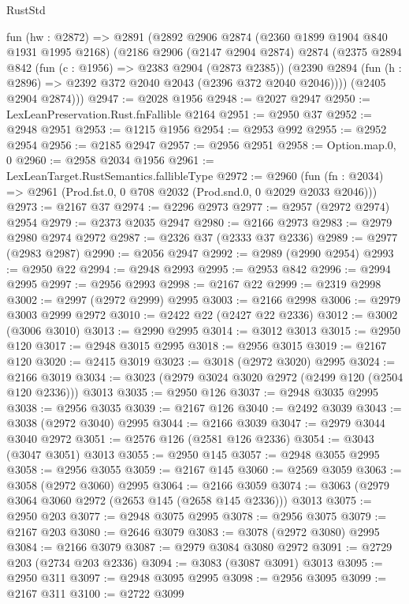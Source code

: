 \begin{lexlean}{RustStd}
\begin{coremodule}
  fun (hw : @2872) =>
  @2891
    (@2892
      @2906
      @2874
      (@2360 @1899 @1904 @840 @1931 @1995 @2168)
      (@2186
        @2906
        (@2147 @2904 @2874)
        @2874
        (@2375
          @2894
          @842
          (fun (c : @1956) => @2383 @2904 (@2873 @2385))
          (@2390 @2894 (fun (h : @2896) => @2392 @372 @2040 @2043 (@2396 @372 @2040 @2046))))
        (@2405 @2904 @2874)))
@2947 := @2028 @1956
@2948 := @2027 @2947
@2950 := LexLeanPreservation.Rust.fnFallible @2164
@2951 := @2950 @37
@2952 := @2948 @2951
@2953 := @1215 @1956
@2954 := @2953 @992
@2955 := @2952 @2954
@2956 := @2185 @2947
@2957 := @2956 @2951
@2958 := Option.map.{0, 0}
@2960 := @2958 @2034 @1956
@2961 := LexLeanTarget.RustSemantics.fallibleType
@2972 := @2960
    (fun (fn : @2034) => @2961 (Prod.fst.{0, 0} @708 @2032 (Prod.snd.{0, 0} @2029 @2033 @2046)))
@2973 := @2167 @37
@2974 := @2296 @2973
@2977 := @2957 (@2972 @2974) @2954
@2979 := @2373 @2035 @2947
@2980 := @2166 @2973
@2983 := @2979 @2980 @2974 @2972
@2987 := @2326 @37 (@2333 @37 @2336)
@2989 := @2977 (@2983 @2987)
@2990 := @2056 @2947
@2992 := @2989 (@2990 @2954)
@2993 := @2950 @22
@2994 := @2948 @2993
@2995 := @2953 @842
@2996 := @2994 @2995
@2997 := @2956 @2993
@2998 := @2167 @22
@2999 := @2319 @2998
@3002 := @2997 (@2972 @2999) @2995
@3003 := @2166 @2998
@3006 := @2979 @3003 @2999 @2972
@3010 := @2422 @22 (@2427 @22 @2336)
@3012 := @3002 (@3006 @3010)
@3013 := @2990 @2995
@3014 := @3012 @3013
@3015 := @2950 @120
@3017 := @2948 @3015 @2995
@3018 := @2956 @3015
@3019 := @2167 @120
@3020 := @2415 @3019
@3023 := @3018 (@2972 @3020) @2995
@3024 := @2166 @3019
@3034 := @3023 (@2979 @3024 @3020 @2972 (@2499 @120 (@2504 @120 @2336))) @3013
@3035 := @2950 @126
@3037 := @2948 @3035 @2995
@3038 := @2956 @3035
@3039 := @2167 @126
@3040 := @2492 @3039
@3043 := @3038 (@2972 @3040) @2995
@3044 := @2166 @3039
@3047 := @2979 @3044 @3040 @2972
@3051 := @2576 @126 (@2581 @126 @2336)
@3054 := @3043 (@3047 @3051) @3013
@3055 := @2950 @145
@3057 := @2948 @3055 @2995
@3058 := @2956 @3055
@3059 := @2167 @145
@3060 := @2569 @3059
@3063 := @3058 (@2972 @3060) @2995
@3064 := @2166 @3059
@3074 := @3063 (@2979 @3064 @3060 @2972 (@2653 @145 (@2658 @145 @2336))) @3013
@3075 := @2950 @203
@3077 := @2948 @3075 @2995
@3078 := @2956 @3075
@3079 := @2167 @203
@3080 := @2646 @3079
@3083 := @3078 (@2972 @3080) @2995
@3084 := @2166 @3079
@3087 := @2979 @3084 @3080 @2972
@3091 := @2729 @203 (@2734 @203 @2336)
@3094 := @3083 (@3087 @3091) @3013
@3095 := @2950 @311
@3097 := @2948 @3095 @2995
@3098 := @2956 @3095
@3099 := @2167 @311
@3100 := @2722 @3099

\end{coremodule}
\end{lexlean}
